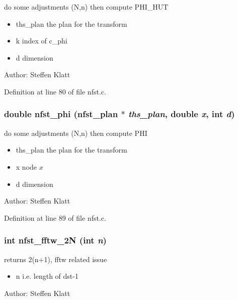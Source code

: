 do some adjustments (N,n) then compute PHI\_\-HUT 

\begin{itemize}
\item ths\_\-plan the plan for the transform \item k index of c\_\-phi \item d dimension\end{itemize}
\begin{Desc}
\item[Author:]Steffen Klatt \end{Desc}


Definition at line 80 of file nfst.c.\hypertarget{group__nfsct_gec803ab48734df96a9f21d66cbb71e23}{
\subsubsection{\setlength{\rightskip}{0pt plus 5cm}double nfst\_\-phi ({\bf nfst\_\-plan} $\ast$ {\em ths\_\-plan}, double {\em x}, int {\em d})}}
\label{group__nfsct_gec803ab48734df96a9f21d66cbb71e23}


do some adjustments (N,n) then compute PHI 

\begin{itemize}
\item ths\_\-plan the plan for the transform \item x node $x$ \item d dimension\end{itemize}
\begin{Desc}
\item[Author:]Steffen Klatt \end{Desc}


Definition at line 89 of file nfst.c.\hypertarget{group__nfsct_ge2f6c7dd71f57ba413df7f9e0d9c8c6d}{
\subsubsection{\setlength{\rightskip}{0pt plus 5cm}int nfst\_\-fftw\_\-2N (int {\em n})}}
\label{group__nfsct_ge2f6c7dd71f57ba413df7f9e0d9c8c6d}


returns 2(n+1), fftw related issue 

\begin{itemize}
\item n i.e. length of dst-1\end{itemize}
\begin{Desc}
\item[Author:]Steffen Klatt \end{Desc}


